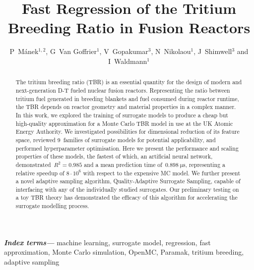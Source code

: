 \documentclass[12pt]{iopart}
\providecommand{\keywords}[1]{\textbf{\textit{Index terms---}} #1}
\begin{document}

\title[Fast Regression of the Tritium Breeding Ratio in Fusion Reactors]{Fast Regression of the
Tritium Breeding Ratio in Fusion Reactors}

\author{P~Mánek$^{1,2}$, G~Van Goffrier$^1$, V~Gopakumar$^3$, N~Nikolaou$^1$, J~Shimwell$^3$ and I~Waldmann$^1$}

\address{$^1$ Department of Physics and Astronomy, University College London, Gower Street, London WC1E~6BT, UK}
\address{$^2$ Institute of Experimental and Applied Physics, Czech Technical University, Husova 240/5, Prague 110~00, Czech Republic}
\address{$^3$ UK Atomic Energy Authority, Culham Science Centre, OX14~3DB Abingdon, UK}


\begin{abstract}
	The tritium breeding ratio (TBR) is an essential quantity for the design of
	modern and next-generation D-T fueled nuclear fusion reactors. Representing the
	ratio between tritium fuel generated in breeding blankets and fuel consumed
	during reactor runtime, the TBR depends on reactor geometry and material
	properties in a complex manner. In this work, we explored the
	training of surrogate models to produce a cheap but high-quality approximation
	for a Monte Carlo TBR model in use at the UK Atomic Energy Authority. We
	investigated possibilities for dimensional reduction of its feature space, reviewed
	9~families of surrogate models for potential
	applicability, and performed hyperparameter optimisation. Here we present the
	performance and scaling properties of these
	models, the fastest of which, an artificial neural network,
	demonstrated~$R^2=\num{0.985}$ and a mean
	prediction time of~$\SI{0.898}{\micro\second}$, representing a relative speedup of $8\cdot 10^6$
	with respect to the expensive MC model. We further present a novel adaptive
	sampling algorithm, Quality-Adaptive Surrogate Sampling, capable
	of interfacing with any of the individually studied surrogates. Our preliminary
	testing on a toy TBR theory has demonstrated the efficacy of this algorithm for
	accelerating the surrogate modelling process.
\end{abstract}

\keywords{machine learning, surrogate model, regression, fast approximation,
Monte Carlo simulation, OpenMC, Paramak, tritium breeding, adaptive sampling}
\submitto{\NF}
\maketitle
\ioptwocol
\end{document}
